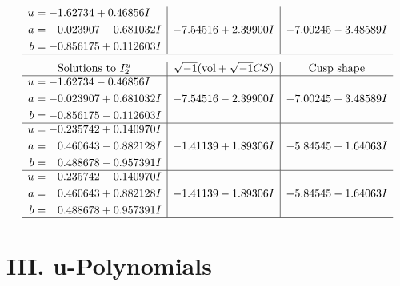 \documentclass[1p]{elsarticle_modified}
\theoremstyle{definition}
\newcommand{\I}{\sqrt{-1}}
\begin{document}
$$\begin{array}{c|c|c}
\begin{aligned}
u &= -1.62734 + 0.46856 I \\
a &= -0.023907 - 0.681032 I \\
b &= -0.856175 + 0.112603 I\end{aligned}
 & -7.54516 + 2.39900 I & -7.00245 - 3.48589 I\\
 \hline 
 \end{array}$$\newpage$$\begin{array}{c|c|c}  
\text{Solutions to }I^u_{2}& \I (\text{vol} + \sqrt{-1}CS) & \text{Cusp shape}\\
 \hline 
\begin{aligned}
u &= -1.62734 - 0.46856 I \\
a &= -0.023907 + 0.681032 I \\
b &= -0.856175 - 0.112603 I\end{aligned}
 & -7.54516 - 2.39900 I & -7.00245 + 3.48589 I \\ \hline\begin{aligned}
u &= -0.235742 + 0.140970 I \\
a &= \phantom{-}0.460643 - 0.882128 I \\
b &= \phantom{-}0.488678 - 0.957391 I\end{aligned}
 & -1.41139 + 1.89306 I & -5.84545 + 1.64063 I \\ \hline\begin{aligned}
u &= -0.235742 - 0.140970 I \\
a &= \phantom{-}0.460643 + 0.882128 I \\
b &= \phantom{-}0.488678 + 0.957391 I\end{aligned}
 & -1.41139 - 1.89306 I & -5.84545 - 1.64063 I\\
 \hline 
 \end{array}$$\newpage
\newpage\renewcommand{\arraystretch}{1}
\centering \section*{ III. u-Polynomials}
\end{document}

